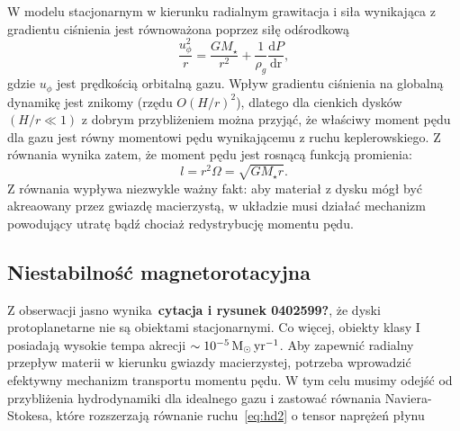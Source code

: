 %
\par W modelu stacjonarnym w kierunku radialnym grawitacja i siła wynikająca z
gradientu ciśnienia jest równoważona poprzez siłę odśrodkową
\begin{equation}\label{eq:radial_balance}
\frac{u_\phi^2}{r} = \frac{GM_\star}{r^2} +
  \frac{1}{\rho_g}\frac{\textrm{d}P}{\textrm{dr}},
\end{equation}
gdzie $u_\phi$ jest prędkością orbitalną gazu. Wpływ gradientu ciśnienia na
globalną dynamikę jest znikomy (rzędu $O(H/r)^2$), dlatego dla cienkich dysków
$(H/r \ll 1)$ z dobrym przybliżeniem można przyjąć, że właściwy moment pędu dla
gazu jest równy momentowi pędu wynikającemu z ruchu keplerowskiego. Z równania
 wynika zatem, że moment pędu jest rosnącą funkcją
promienia:
\begin{equation}\label{eq:angmom}
l = r^2\Omega = \sqrt{GM_\star r}.
\end{equation}
Z równania  wypływa niezwykle ważny fakt: aby materiał z dysku
mógł być akreaowany przez gwiazdę macierzystą, w układzie musi działać mechanizm
powodujący utratę bądź chociaż redystrybucję momentu pędu.
\subsection{Niestabilność magnetorotacyjna}
Z obserwacji jasno wynika~{\bf cytacja i rysunek 0402599?}, że dyski
protoplanetarne nie są obiektami stacjonarnymi. Co więcej, obiekty klasy I
posiadają wysokie tempa akrecji $\sim 10^{-5}\hbox{$\mathrm{\thinspace M_{\odot}}$}\hbox{$\thinspace\textrm{yr}$}^{-1}$. Aby zapewnić
radialny przepływ materii w kierunku gwiazdy macierzystej, potrzeba wprowadzić
efektywny mechanizm transportu momentu pędu. W tym celu musimy odejść od
przybliżenia hydrodynamiki dla idealnego gazu i zastować równania
Naviera-Stokesa, które rozszerzają równanie ruchu~\ref{eq:hd2} o tensor naprężeń
płynu

